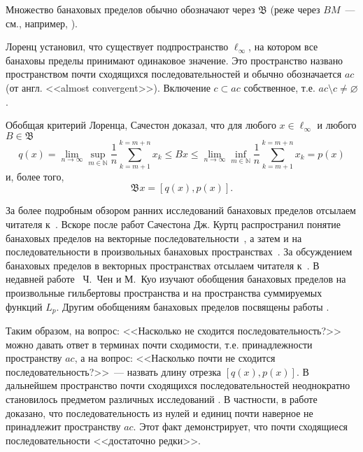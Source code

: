Множество банаховых пределов обычно обозначают через $\mathfrak{B}$
(реже через $BM$~--- см., например, \cite{alekhno2012superposition,alekhno2015banach}).

Лоренц \cite{lorentz1948contribution} установил, что существует подпространство $\ell_\infty$,
на котором все банаховы пределы принимают одинаковое значение.
Это пространство названо пространством почти сходящихся последовательностей и обычно обозначается $ac$
(от англ. <<almost convergent>>).
Включение $c \subset ac$ собственное, т.е. $ac \setminus c \neq \varnothing$.


Обобщая критерий Лоренца, Сачестон \cite{sucheston1967banach} доказал, что для любого $x\in\ell_\infty$
и любого $B\in\mathfrak{B}$
\begin{equation*}
	q(x) =
	\lim_{n\to\infty} \sup_{m\in\mathbb{N}} \frac{1}{n} \sum_{k=m+1}^{k=m+n} x_k
	\leq
	Bx
	\leq
	\lim_{n\to\infty} \inf_{m\in\mathbb{N}} \frac{1}{n} \sum_{k=m+1}^{k=m+n} x_k
	= p(x)
\end{equation*}
и, более того,
\begin{equation*}
	\mathfrak{B}x = [q(x), p(x)]
	.
\end{equation*}


За более подробным обзором ранних исследований банаховых пределов отсылаем читателя к~\cite{greenleaf1969invariant,day1973normed,kangro1976theory}.
Вскоре после работ Сачестона Дж. Куртц распространил понятие банаховых пределов
на векторные последовательности~\cite{kurtz1970almost},
а затем и на последовательности в произвольных банаховых пространствах~\cite{kurtz1972almost}.
За обсуждением банаховых пределов в векторных пространствах отсылаем читателя
к~\cite{deeds1968summability,hajdukovic1975almost,armario2013vector,garcia2015extremal,garcia2016fundamental}.
В недавней работе~\cite{chen2007characterizations} Ч.~Чен и М.~Куо изучают обобщения банаховых пределов
на произвольные гильбертовы пространства и на пространства суммируемых функций $L_p$.
Другим обобщениям банаховых пределов посвящены работы
\cite{hajdukovic1975functionals,koga2016generalization}.

Таким образом, на вопрос: <<Насколько не сходится последовательность?>> %
можно давать ответ в терминах почти сходимости, т.е. принадлежности пространству $ac$,
а на вопрос: <<Насколько почти не сходится последовательность?>>~---
назвать длину отрезка $[q(x), p(x)]$.
В дальнейшем пространство почти сходящихся последовательностей неоднократно становилось предметом
различных исследований
\cite{semenov2006space,usachev2008transformations}.
В частности, в работе~\cite{connor1990almost} доказано,
что последовательность из нулей и единиц почти наверное не принадлежит пространству $ac$.
Этот факт демонстрирует, что почти сходящиеся последовательности <<достаточно редки>>.

